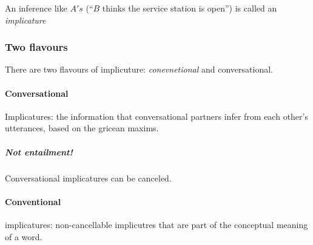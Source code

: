 \documentclass{article}
\begin{document}
An inference like $A's$ (``$B$ thinks the service station is open'')
is called an \emph{implicature}

\subsubsection{Two flavours}
There are two flavours of implicuture: \emph{conevnetional} and 
conversational.

\paragraph{Conversational} Implicatures: the information that conversational
partners infer from each other's utterances, based on the gricean maxims.

\subparagraph{Not entailment!} Conversational implicatures can be canceled.

\paragraph{Conventional} implicatures: non-cancellable implicutres
that are part of the conceptual meaning of a word.
\end{document}

